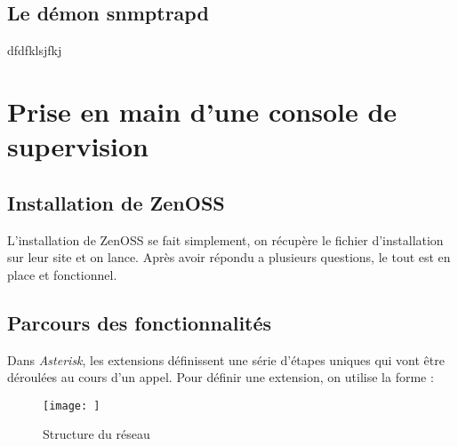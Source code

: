 \documentclass[12pt,a4paper,notitlepage]{article}
\begin{document}
\subsection{Le démon snmptrapd}
dfdfklsjfkj

\section{Prise en main d'une console de supervision}
\subsection{Installation de ZenOSS}
L'installation de ZenOSS se fait simplement, on récupère le fichier d'installation sur leur site et on lance. Après avoir répondu a plusieurs questions, le tout est en place et fonctionnel. \\


\subsection{Parcours des fonctionnalités}

Dans \textit{Asterisk}, les extensions définissent une série d'étapes uniques qui vont être déroulées au cours d'un appel. Pour définir une extension, on utilise la forme : \\

\begin{figure}[!h]
\begin{center}
\texttt{[image: ]}
\caption{Structure du réseau}
\label{fig:da}
\end{center}
\end{figure}
\end{document}
